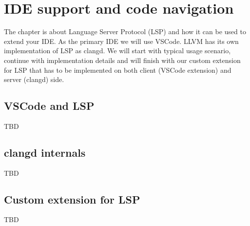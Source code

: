 \chapter{IDE support and code navigation}
The chapter is about Language Server Protocol (LSP) and how it can be used to extend
your IDE. As the primary IDE we will use VSCode. LLVM has its own implementation
of LSP as clangd. We will start with typical usage scenario, continue with
implementation details and will finish with our custom extension for LSP that
has to be implemented on both client (VSCode extension) and server (clangd)
side.

\section{VSCode and LSP}
TBD

\section{clangd internals}
TBD

\section{Custom extension for LSP}
TBD
